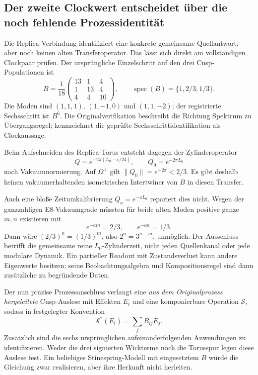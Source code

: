 \subsection{Der zweite Clockwert entscheidet über die noch fehlende Prozessidentität}
Die Replica-Verbindung identifiziert eine konkrete gemeinsame Quellantwort, aber noch keinen alten Transferoperator. Das lässt sich direkt am vollständigen Clockpaar prüfen. Der ursprüngliche Einzelschritt auf den drei Cusp-Populationen ist
\begin{equation}
B=\frac1{18}
\begin{pmatrix}13&1&4\\1&13&4\\4&4&10\end{pmatrix},
\qquad \operatorname{spec}(B)=\{1,2/3,1/3\}.
\end{equation}
Die Moden sind $(1,1,1)$, $(1,-1,0)$ und $(1,1,-2)$; der registrierte Sechsschritt ist $B^6$. Die Originalverifikation  beschreibt die Richtung Spektrum zu Übergangsregel;  kennzeichnet die geprüfte Sechsschrittidentifikation als Clockaussage.

Beim Aufschneiden des Replica-Torus entsteht dagegen der Zylinderoperator
\begin{equation}
Q=e^{-2\pi(L_0-c/24)},\qquad Q_0=e^{-2\pi L_0}
\end{equation}
nach Vakuumnormierung. Auf $\Omega^\perp$ gilt $\|Q_0\|=e^{-2\pi}<2/3$. Es gibt deshalb keinen vakuumerhaltenden isometrischen Intertwiner von $B$ in diesen Transfer.

Auch eine bloße Zeitumkalibrierung $Q_a=e^{-aL_0}$ repariert dies nicht. Wegen der ganzzahligen E8-Vakuumgrade müssten für beide alten Moden positive ganze $m,n$ existieren mit
\begin{equation}
e^{-am}=2/3,\qquad e^{-an}=1/3.
\end{equation}
Dann wäre $(2/3)^n=(1/3)^m$, also $2^n=3^{n-m}$, unmöglich.
Der Ausschluss betrifft die gemeinsame reine $L_0$-Zylinderzeit, nicht jeden Quellenkanal oder jede modulare Dynamik. Ein partieller Readout mit Zustandsverlust kann andere Eigenwerte besitzen; seine Beobachtungsalgebra und Kompositionsregel sind dann zusätzliche zu begründende Daten.

Der nun präzise Prozessanschluss verlangt eine \emph{aus dem Originalprozess hergeleitete} Cusp-Auslese mit Effekten $E_i$ und eine komponierbare Operation $\mathcal S$, sodass in festgelegter Konvention
\begin{equation}\label{eq:nativeclockmap}
\mathcal S^*(E_i)=\sum_jB_{ij}E_j.
\end{equation}
Zusätzlich sind die sechs ursprünglichen aufeinanderfolgenden Anwendungen zu identifizieren. Weder die drei signierten Wickterme noch die Torusspur legen diese Auslese fest. Ein beliebiges Stinespring-Modell mit eingesetztem $B$ würde die Gleichung zwar realisieren, aber ihre Herkunft nicht herleiten.

